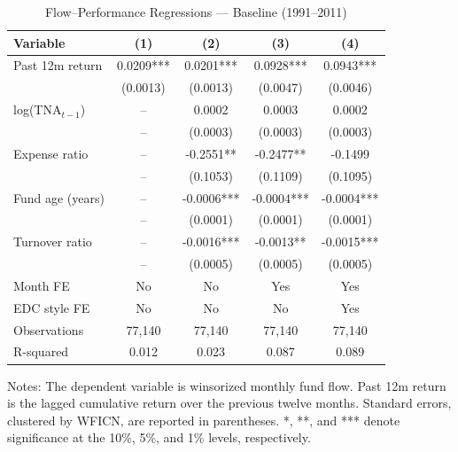 \documentclass{article}
\begin{document}
\begin{table}[htbp]
\centering
\caption{Flow--Performance Regressions --- Baseline (1991--2011)}
\label{tab:regression-baseline}
\small
\begin{threeparttable}
\begin{tabular}{lcccc}
\toprule
Variable & (1) & (2) & (3) & (4) \\
\midrule
Past 12m return & 0.0209*** & 0.0201*** & 0.0928*** & 0.0943*** \\
 & (0.0013) & (0.0013) & (0.0047) & (0.0046) \\
log(TNA$_{t-1}$) & -- & 0.0002 & 0.0003 & 0.0002 \\
 & -- & (0.0003) & (0.0003) & (0.0003) \\
Expense ratio & -- & -0.2551** & -0.2477** & -0.1499 \\
 & -- & (0.1053) & (0.1109) & (0.1095) \\
Fund age (years) & -- & -0.0006*** & -0.0004*** & -0.0004*** \\
 & -- & (0.0001) & (0.0001) & (0.0001) \\
Turnover ratio & -- & -0.0016*** & -0.0013** & -0.0015*** \\
 & -- & (0.0005) & (0.0005) & (0.0005) \\
\midrule
Month FE & No & No & Yes & Yes \\
EDC style FE & No & No & No & Yes \\
Observations & 77,140 & 77,140 & 77,140 & 77,140 \\
R-squared & 0.012 & 0.023 & 0.087 & 0.089 \\
\bottomrule
\end{tabular}
\begin{tablenotes}
\footnotesize
\item Notes: The dependent variable is winsorized monthly fund flow. Past 12m return is the lagged cumulative return over the previous twelve months. Standard errors, clustered by WFICN, are reported in parentheses. *, **, and *** denote significance at the 10\%, 5\%, and 1\% levels, respectively.
\end{tablenotes}
\end{threeparttable}
\end{table}

\end{document}
